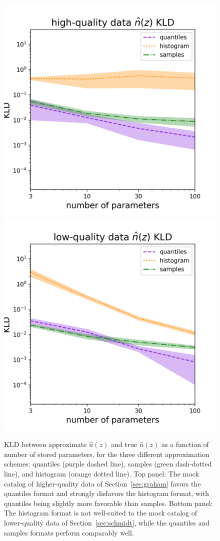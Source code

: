 \documentclass[\docopts]{\docclass}
\begin{document}
\begin{figure}
  \includegraphics[width=0.9\columnwidth]{figures/graham_kld.png}\\
  \includegraphics[width=0.9\columnwidth]{figures/schmidt_kld.png}
  \caption{KLD between approximate $\hat{n}(z)$ and true $\hat{n}(z)$ as a 
function of number of stored parameters, for the three different approximation 
schemes: quantiles (purple dashed line), samples (green dash-dotted line), and 
histogram (orange dotted line).
  Top panel: The mock catalog of higher-quality data of 
Section~\ref{sec:graham} favors the quantiles format and strongly disfavors the 
histogram format, with quantiles being slightly more favorable than samples.
  Bottom panel: The histogram format is not well-suited to the mock catalog of 
lower-quality data of Section~\ref{sec:schmidt}, while the quantiles and 
samples formats perform comparably well.
  \label{fig:kld}}
\end{figure}
\end{document}

